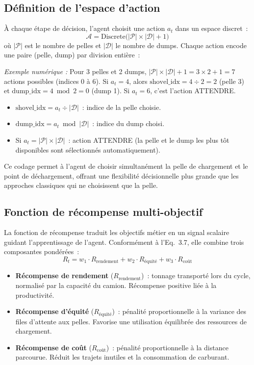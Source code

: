 \documentclass[11pt,a4paper]{report}
\begin{document}
\subsection{Définition de l'espace d'action}
\label{sec:espace-action}
À chaque étape de décision, l'agent choisit une action $a_t$ dans un espace discret~:
\begin{equation}
    \mathcal{A} = \text{Discrete}\big(|\mathcal{P}| \times |\mathcal{D}| + 1\big)
\end{equation}
où $|\mathcal{P}|$ est le nombre de pelles et $|\mathcal{D}|$ le nombre de dumps. Chaque action encode une paire (pelle, dump) par division entière~:

\textit{Exemple numérique :} Pour 3 pelles et 2 dumps, $|\mathcal{P}| \times |\mathcal{D}| + 1 = 3 \times 2 + 1 = 7$ actions possibles (indices 0 à 6). Si $a_t = 4$, alors $\text{shovel\_idx} = 4 \div 2 = 2$ (pelle 3) et $\text{dump\_idx} = 4 \bmod 2 = 0$ (dump 1). Si $a_t = 6$, c'est l'action ATTENDRE.
\begin{itemize}
    \item $\text{shovel\_idx} = a_t \div |\mathcal{D}|$~: indice de la pelle choisie.
    \item $\text{dump\_idx} = a_t \bmod |\mathcal{D}|$~: indice du dump choisi.
    \item Si $a_t = |\mathcal{P}| \times |\mathcal{D}|$~: action ATTENDRE (la pelle et le dump les plus tôt disponibles sont sélectionnés automatiquement).
\end{itemize}
Ce codage permet à l'agent de choisir simultanément la pelle de chargement et le point de déchargement, offrant une flexibilité décisionnelle plus grande que les approches classiques qui ne choisissent que la pelle.

\subsection{Fonction de récompense multi-objectif}
\label{sec:fonction-recompense}
La fonction de récompense traduit les objectifs métier en un signal scalaire guidant l'apprentissage de l'agent. Conformément à l'Eq.~3.7, elle combine trois composantes pondérées~:
\begin{equation}
    R_t = w_1 \cdot R_{\text{rendement}} + w_2 \cdot R_{\text{équité}} + w_3 \cdot R_{\text{coût}}
\end{equation}
\begin{itemize}
    \item \textbf{Récompense de rendement} ($R_{\text{rendement}}$)~: tonnage transporté lors du cycle, normalisé par la capacité du camion. Récompense positive liée à la productivité.
    \item \textbf{Récompense d'équité} ($R_{\text{équité}}$)~: pénalité proportionnelle à la variance des files d'attente aux pelles. Favorise une utilisation équilibrée des ressources de chargement.
    \item \textbf{Récompense de coût} ($R_{\text{coût}}$)~: pénalité proportionnelle à la distance parcourue. Réduit les trajets inutiles et la consommation de carburant.
\end{itemize}
\end{document}
